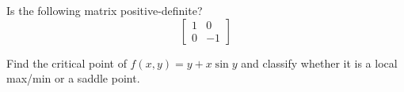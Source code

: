 \documentclass[openany]{book}
\begin{document}
\begin{prob}
    Is the following matrix positive-definite?
    \begin{equation*}
        \begin{bmatrix}
            1&0\\
            0&-1
        \end{bmatrix}
    \end{equation*}
\end{prob}


\begin{prob}
    Find the critical point of $f(x,y)=y+x\sin y$ and classify whether it is a local max/min or a saddle point.
\end{prob}
\end{document}

